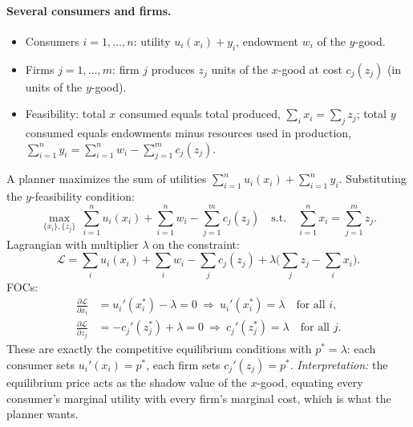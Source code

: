\paragraph{Several consumers and firms.}
\begin{itemize}
\item Consumers $i=1,\dots,n$: utility $u_i(x_i)+y_i$, endowment $w_i$ of the $y$-good.
\item Firms $j=1,\dots,m$: firm $j$ produces $z_j$ units of the $x$-good at cost $c_j(z_j)$ (in units of the $y$-good).
\item Feasibility: total $x$ consumed equals total produced, $\sum_i x_i=\sum_j z_j$; total $y$ consumed equals endowments minus resources used in production, $\sum_{i=1}^n y_i=\sum_{i=1}^n w_i-\sum_{j=1}^m c_j(z_j)$.
\end{itemize}
A planner maximizes the sum of utilities $\sum_{i=1}^n u_i(x_i)+\sum_{i=1}^n y_i$. Substituting the $y$-feasibility condition:
\begin{equation}\label{eq:micro-planner}
\max_{\{x_i\},\{z_j\}}\ \sum_{i=1}^n u_i(x_i)+\sum_{i=1}^n w_i-\sum_{j=1}^m c_j(z_j)\quad\text{s.t.}\quad \sum_{i=1}^n x_i=\sum_{j=1}^m z_j .
\end{equation}
Lagrangian with multiplier $\lambda$ on the constraint:
\[
\mathcal L=\sum_i u_i(x_i)+\sum_i w_i-\sum_j c_j(z_j)+\lambda\Big(\sum_j z_j-\sum_i x_i\Big).
\]
FOCs:
\begin{align*}
\frac{\partial\mathcal L}{\partial x_i}&=u_i'(x_i^*)-\lambda=0\ \Longrightarrow\ u_i'(x_i^*)=\lambda\quad\text{for all } i,\\
\frac{\partial\mathcal L}{\partial z_j}&=-c_j'(z_j^*)+\lambda=0\ \Longrightarrow\ c_j'(z_j^*)=\lambda\quad\text{for all } j.
\end{align*}
These are exactly the competitive equilibrium conditions with $p^*=\lambda$: each consumer sets $u_i'(x_i)=p^*$, each firm sets $c_j'(z_j)=p^*$. \emph{Interpretation:} the equilibrium price acts as the shadow value of the $x$-good, equating every consumer's marginal utility with every firm's marginal cost, which is what the planner wants.

